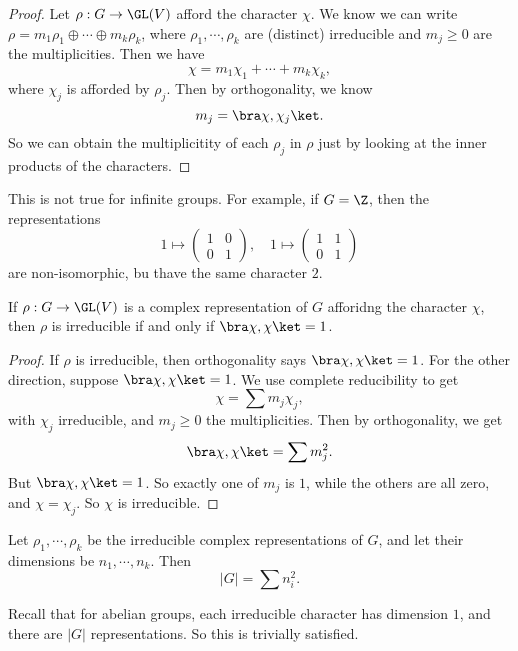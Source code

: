 \documentclass[a4paper]{article}
\begin{document}
\begin{proof}
  Let $\rho: G \to \GL(V)$ afford the character $\chi$. We know we can write $\rho = m_1 \rho_1 \oplus \cdots \oplus m_k \rho_k$, where $\rho_1, \cdots, \rho_k$ are (distinct) irreducible and $m_j \geq 0$ are the multiplicities. Then we have
  \[
    \chi = m_1 \chi_1 + \cdots + m_k \chi_k,
  \]
  where $\chi_j$ is afforded by $\rho_j$. Then by orthogonality, we know
  \[
    m_j = \bra \chi, \chi_j\ket.
  \]
  So we can obtain the multiplicitity of each $\rho_j$ in $\rho$ just by looking at the inner products of the characters.
\end{proof}
This is not true for infinite groups. For example, if $G = \Z$, then the representations
\[
  1 \mapsto
  \begin{pmatrix}
    1 & 0\\
    0 & 1
  \end{pmatrix},\quad
  1 \mapsto
  \begin{pmatrix}
    1 & 1\\
    0 & 1
  \end{pmatrix}
\]
are non-isomorphic, bu thave the same character $2$.

\begin{cor}
  If $\rho: G \to \GL(V)$ is a complex representation of $G$ afforidng the character $\chi$, then $\rho$ is irreducible if and only if $\bra \chi, \chi \ket = 1$.
\end{cor}

\begin{proof}
  If $\rho$ is irreducible, then orthogonality says $\bra \chi, \chi \ket = 1$. For the other direction, suppose $\bra \chi, \chi\ket = 1$. We use complete reducibility to get
  \[
    \chi = \sum m_j \chi_j,
  \]
  with $\chi_j$ irreducible, and $m_j \geq 0$ the multiplicities. Then by orthogonality, we get
  \[
    \bra \chi, \chi\ket = \sum m_j^2.
  \]
  But $\bra \chi, \chi\ket = 1$. So exactly one of $m_j$ is $1$, while the others are all zero, and $\chi = \chi_j$. So $\chi$ is irreducible.
\end{proof}

\begin{thm}
  Let $\rho_1, \cdots, \rho_k$ be the irreducible complex representations of $G$, and let their dimensions be $n_1, \cdots, n_k$. Then
  \[
    |G| = \sum n_i^2.
  \]
\end{thm}
Recall that for abelian groups, each irreducible character has dimension $1$, and there are $|G|$ representations. So this is trivially satisfied.
\end{document}
